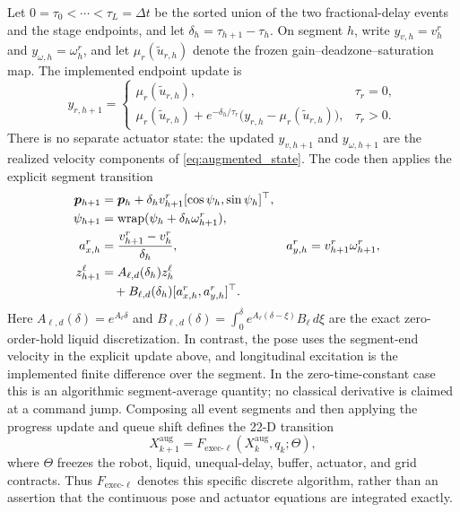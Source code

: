 Let $0=\tau_0<\cdots<\tau_L=\Delta t$ be the sorted union of the two
fractional-delay events and the stage endpoints, and let
$\delta_h=\tau_{h+1}-\tau_h$.  On segment $h$, write
$y_{v,h}=v_h^r$ and $y_{\omega,h}=\omega_h^r$, and let
$\mu_r(\widetilde u_{r,h})$ denote the frozen gain--deadzone--saturation map.
The implemented endpoint update is
\begin{equation}
  y_{r,h+1}=
  \begin{cases}
  \mu_r(\widetilde u_{r,h}),&\tau_r=0,\\
  \mu_r(\widetilde u_{r,h})+
  e^{-\delta_h/\tau_r}
  \bigl(y_{r,h}-\mu_r(\widetilde u_{r,h})\bigr),&\tau_r>0.
  \end{cases}
  \label{eq:actuator_update}
\end{equation}
There is no separate actuator state: the updated $y_{v,h+1}$ and
$y_{\omega,h+1}$ are the realized velocity components of
\eqref{eq:augmented_state}.  The code then applies the explicit segment
transition
\begin{align}
  \bm p_{h+1}
  &=\bm p_h+\delta_h v^r_{h+1}
    [\cos\psi_h,\sin\psi_h]^\top,
  \notag\\
  \psi_{h+1}
  &=\operatorname{wrap}(\psi_h+\delta_h\omega^r_{h+1}),
  \label{eq:realized_kinematics}\\
  a^r_{x,h}
  &=\frac{v^r_{h+1}-v^r_h}{\delta_h},
  &a^r_{y,h}
  &=v^r_{h+1}\omega^r_{h+1},
  \label{eq:realized_excitation}\\
  z^\ell_{h+1}
  &=A_{\ell,d}(\delta_h)z^\ell_h
  \notag\\[-0.3ex]
  &\quad+B_{\ell,d}(\delta_h)
    [a^r_{x,h},a^r_{y,h}]^\top .
  \label{eq:discrete_liquid_update}
\end{align}
Here
$A_{\ell,d}(\delta)=e^{A_\ell\delta}$ and
$B_{\ell,d}(\delta)=\int_0^\delta e^{A_\ell(\delta-\xi)}B_\ell\,d\xi$
are the exact zero-order-hold liquid discretization.  In contrast, the pose
uses the segment-end velocity in the explicit update above, and longitudinal
excitation is the implemented finite difference over the segment.  In the
zero-time-constant case this is an algorithmic segment-average quantity; no
classical derivative is claimed at a command jump.  Composing all event
segments and then applying the progress update and queue shift defines the
22-D transition
\begin{equation}
  X^{\mathrm{aug}}_{k+1}
  =F_{\mathrm{exec}\text{-}\ell}
  (X^{\mathrm{aug}}_k,q_k;\Theta),
  \label{eq:delay_augmented_dynamics}
\end{equation}
where $\Theta$ freezes the robot, liquid, unequal-delay, buffer, actuator, and
grid contracts.  Thus $F_{\mathrm{exec}\text{-}\ell}$ denotes this specific
discrete algorithm, rather than an assertion that the continuous pose and
actuator equations are integrated exactly.

